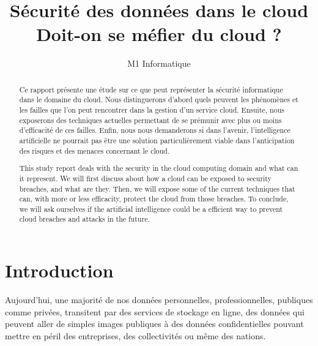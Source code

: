 \documentclass[a4paper, 12pt]{article}
\title{Sécurité des données dans le cloud\\Doit-on se méfier du cloud ?}
\author{M1 Informatique}
\date{}
\begin{document}
  \renewcommand{\thepage}{}
  \maketitle
  \newpage
  \tableofcontents
  \newpage

  \renewcommand{\thepage}{\arabic{page}}
  \setcounter{page}{1}
  \begin{abstract}
    Ce rapport présente une étude sur ce que peut représenter la sécurité
    informatique dans le domaine du cloud. Nous distinguerons d'abord quels
    peuvent les phénomènes et les failles que l'on peut rencontrer dans la
    gestion d'un service cloud. Ensuite, nous exposerons des techniques
    actuelles permettant de se prémunir avec plus ou moins d'efficacité de ces
    failles. Enfin, nous nous demanderons si dans l'avenir, l'intelligence
    artificielle ne pourrait pas être une solution particulièrement viable dans
    l'anticipation des risques et des menaces concernant le cloud.
  \end{abstract}

  \begin{abstract}
    This study report deals with the security in the cloud computing domain and
    what can it represent. We will first discuss about how a cloud can be
    exposed to security breaches, and what are they. Then, we will expose some
    of the current techniques that can, with more or less efficacity, protect
    the cloud from those breaches. To conclude, we will ask ourselves if the
    artificial intelligence could be a efficient way to prevent cloud breaches
    and attacks in the future.
  \end{abstract}

  \newpage
  \section{Introduction}
    Aujourd'hui, une majorité de nos données personnelles, professionnelles,
    publiques comme privées, transitent par des services de stockage en ligne,
    des données qui peuvent aller de simples images publiques à des données
    confidentielles pouvant mettre en péril des entreprises, des collectivités
    ou même des nations. \\
\end{document}
